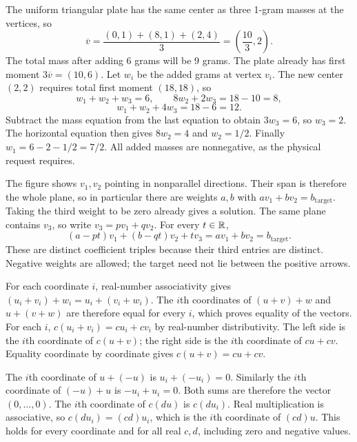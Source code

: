 The uniform triangular plate has the same center as three 1-gram masses
at the vertices, so
\[
\overline v=\frac{(0,1)+(8,1)+(2,4)}3
=\left(\frac{10}3,2\right).
\]
The total mass after adding 6 grams will be 9 grams. The plate already
has first moment $3\overline v=(10,6)$.
Let $w_i$ be the added grams at vertex $v_i$. The new center $(2,2)$
requires total first moment $(18,18)$, so
\[
w_1+w_2+w_3=6,\qquad8w_2+2w_3=18-10=8,
\]
\[
w_1+w_2+4w_3=18-6=12.
\]
Subtract the mass equation from the last equation to obtain $3w_3=6$,
so $w_3=2$. The horizontal equation then gives $8w_2=4$ and
$w_2=1/2$. Finally $w_1=6-2-1/2=7/2$.
All added masses are nonnegative, as the physical request requires.

The figure shows $v_1,v_2$ pointing in nonparallel directions. Their
span is therefore the whole plane, so in particular there are weights
$a,b$ with $av_1+bv_2=b_{\mathrm{target}}$. Taking the third weight
to be zero already gives a solution.
The same plane contains $v_3$, so write $v_3=pv_1+qv_2$.
For every $t\in\mathbb{R}$,
\[
(a-pt)v_1+(b-qt)v_2+tv_3
=av_1+bv_2=b_{\mathrm{target}}.
\]
These are distinct coefficient triples because their third entries are
distinct. Negative weights are allowed; the target need not lie between
the positive arrows.

For each coordinate $i$, real-number associativity gives
$(u_i+v_i)+w_i=u_i+(v_i+w_i)$.
The $i$th coordinates of $(u+v)+w$ and $u+(v+w)$ are therefore equal
for every $i$, which proves equality of the vectors.
For each $i$, $c(u_i+v_i)=cu_i+cv_i$ by real-number distributivity.
The left side is the $i$th coordinate of $c(u+v)$; the right side is
the $i$th coordinate of $cu+cv$. Equality coordinate by coordinate gives
$c(u+v)=cu+cv$.

The $i$th coordinate of $u+(-u)$ is $u_i+(-u_i)=0$.
Similarly the $i$th coordinate of $(-u)+u$ is $-u_i+u_i=0$.
Both sums are therefore the vector $(0,\ldots,0)$.
The $i$th coordinate of $c(du)$ is $c(du_i)$. Real multiplication is
associative, so $c(du_i)=(cd)u_i$, which is the $i$th coordinate of
$(cd)u$. This holds for every coordinate and for all real $c,d$,
including zero and negative values.
